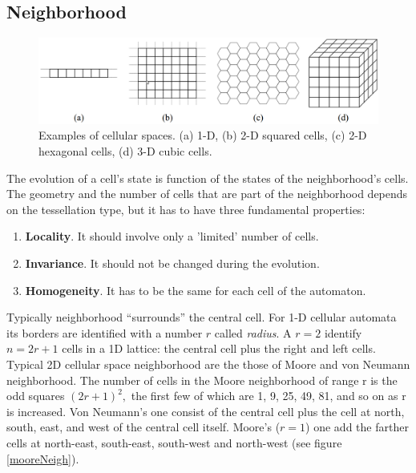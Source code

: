\subsection{Neighborhood}
\begin{figure}
\centering
\caption{Examples of cellular spaces. (a) 1-D, (b) 2-D squared cells,
(c) 2-D hexagonal cells, (d) 3-D cubic cells.}\label{spazioCellulare}
\includegraphics[scale=0.3]{./images/CA_FDM/spazioCellulare}
\end{figure}
The evolution of a cell's state is function of the states of the neighborhood's
cells. The geometry and the number of cells that are part of the neighborhood
depends on the tessellation type, but it has to have three fundamental
properties:
\begin{enumerate}
  \item \textbf{Locality}. It should involve only a 'limited' number of cells.
  \item \textbf{Invariance}. It should not be changed during the evolution.
  \item \textbf{Homogeneity}. It has to be the same for each cell of the
  automaton.
\end{enumerate}
Typically neighborhood ``surrounds'' the central cell. For 1-D cellular automata
its borders are identified with a number \begin{math}r \end{math} called
\textit{radius}\cite{wolfram1983}. A \begin{math}r=2\end{math} identify
\begin{math}n=2r+1\end{math} cells in a 1D lattice: the central cell plus the
right and left cells. Typical 2D cellular space neighborhood are the those of
Moore and von Neumann neighborhood. The number of cells in the Moore
neighborhood of range r is the odd squares \begin{math}(2r+1)^2,\end{math} the
first few of which are 1, 9, 25, 49, 81, and so on as r is increased.
Von Neumann's one consist of the central cell plus the cell at north, south,
east, and west of the central cell itself. Moore's (\begin{math}r=1\end{math})
one add  the farther cells at north-east, south-east, south-west and north-west
(see figure \ref{mooreNeigh}).



